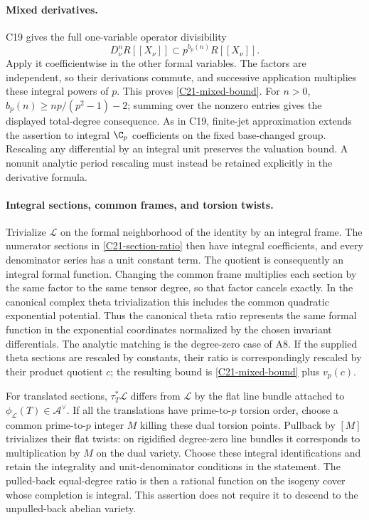 \documentclass[11pt]{article}
\providecommand{\mathscr}[1]{\mathcal{#1}}
\theoremstyle{definition}\newtheorem{definition}[theorem]{Definition}\newtheorem{remark}[theorem]{Remark}
\begin{document}
\paragraph{Mixed derivatives.}
C19 gives the full one-variable operator divisibility
\[
 D_\nu^nR[[X_\nu]]\subset
              p^{b_p(n)}R[[X_\nu]].
\]
Apply it coefficientwise in the other formal variables.
The factors are independent, so their derivations commute,
and successive application multiplies these integral powers
of $p$.  This proves \eqref{C21-mixed-bound}.
For $n>0$, $b_p(n)\geq np/(p^2-1)-2$; summing over the
nonzero entries gives the displayed total-degree consequence.
As in C19, finite-jet approximation extends the assertion to
integral $\C_p$ coefficients on the fixed base-changed group.
Rescaling any differential by an integral unit preserves the
valuation bound.  A nonunit analytic period rescaling must
instead be retained explicitly in the derivative formula.

\paragraph{Integral sections, common frames, and torsion twists.}
Trivialize $\mathscr L$ on the formal neighborhood of the
identity by an integral frame.  The numerator sections in
\eqref{C21-section-ratio} then have integral coefficients,
and every denominator series has a unit constant term.
The quotient is consequently an integral formal function.
Changing the common frame multiplies each section by the
same factor to the same tensor degree, so that factor cancels
exactly.  In the canonical complex theta trivialization this
includes the common quadratic exponential potential.
Thus the canonical theta ratio represents the same formal
function in the exponential coordinates normalized by the
chosen invariant differentials.  The analytic matching is
the degree-zero case of A8.  If the supplied theta sections
are rescaled by constants, their ratio is correspondingly
rescaled by their product quotient $c$; the resulting bound
is \eqref{C21-mixed-bound} plus $v_p(c)$.

For translated sections, $\tau_T^*\mathscr L$ differs from
$\mathscr L$ by the flat line bundle attached to
$\phi_{\mathscr L}(T)\in\mathcal A^\vee$.
If all the translations have prime-to-$p$ torsion order,
choose a common prime-to-$p$ integer $M$ killing these
dual torsion points.  Pullback by $[M]$ trivializes their
flat twists: on rigidified degree-zero line bundles it
corresponds to multiplication by $M$ on the dual variety.
Choose these integral identifications and retain the
integrality and unit-denominator conditions in the statement.
The pulled-back equal-degree ratio is then a rational function
on the isogeny cover whose completion is integral.
This assertion does not require it to descend to the
unpulled-back abelian variety.
\end{document}
